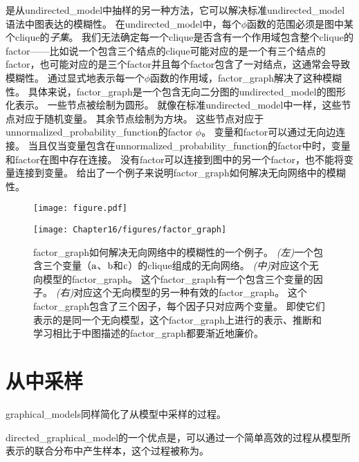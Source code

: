 是从\gls{undirected_model}中抽样的另一种方法，它可以解决标准\gls{undirected_model}语法中图表达的模糊性。
在\gls{undirected_model}中，每个$\phi$函数的范围必须是图中某个\gls{clique}的\emph{子集}。
我们无法确定每一个\gls{clique}是否含有一个作用域包含整个\gls{clique}的\gls{factor}——比如说一个包含三个结点的\gls{clique}可能对应的是一个有三个结点的\gls{factor}，也可能对应的是三个\gls{factor}并且每个\gls{factor}包含了一对结点，这通常会导致模糊性。
通过显式地表示每一个$\phi$函数的作用域，\gls{factor_graph}解决了这种模糊性。
具体来说，\gls{factor_graph}是一个包含无向二分图的\gls{undirected_model}的图形化表示。
一些节点被绘制为圆形。 
就像在标准\gls{undirected_model}中一样，这些节点对应于随机变量。
其余节点绘制为方块。
这些节点对应于\gls{unnormalized_probability_function}的\gls{factor} $\phi$。
变量和\gls{factor}可以通过无向边连接。
当且仅当变量包含在\gls{unnormalized_probability_function}的\gls{factor}中时，变量和\gls{factor}在图中存在连接。
没有\gls{factor}可以连接到图中的另一个\gls{factor}，也不能将变量连接到变量。
给出了一个例子来说明\gls{factor_graph}如何解决无向网络中的模糊性。


\begin{figure}[!htb]
\ifOpenSource
\centerline{\texttt{[image: figure.pdf]}}
\else
	\centerline{\texttt{[image: Chapter16/figures/factor\_graph]}}	
\fi
\caption{\gls{factor_graph}如何解决无向网络中的模糊性的一个例子。
\emph{(左)}一个包含三个变量（$\mathrm{a}$、$\mathrm{b}$和$\mathrm{c}$）的\gls{clique}组成的无向网络。
\emph{(中)}对应这个无向模型的\gls{factor_graph}。
这个\gls{factor_graph}有一个包含三个变量的因子。
\emph{(右)}对应这个无向模型的另一种有效的\gls{factor_graph}。
这个\gls{factor_graph}包含了三个因子，每个因子只对应两个变量。
即使它们表示的是同一个无向模型，这个\gls{factor_graph}上进行的表示、推断和学习相比于中图描述的\gls{factor_graph}都要渐近地廉价。}
	\label{fig:factor_graph}
\end{figure}


\section{从中采样}
\label{sec:sampling_from_graphical_models}

\gls{graphical_models}同样简化了从模型中采样的过程。


\gls{directed_graphical_model}的一个优点是，可以通过一个简单高效的过程从模型所表示的联合分布中产生样本，这个过程被称为。


